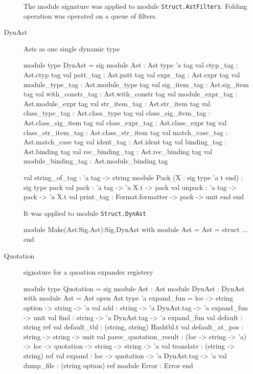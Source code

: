 \begin{description}
The module signature was applied to module
\verb|Struct.AstFilters|. Folding operation was operated on a queue of
filters. 

\item[DynAst] Asts as one single dynamic type

\begin{ocamlcode}
  module type DynAst =
  sig
    module Ast : Ast
    type 'a tag
    val ctyp_tag : Ast.ctyp tag
    val patt_tag : Ast.patt tag
    val expr_tag : Ast.expr tag
    val module_type_tag : Ast.module_type tag
    val sig_item_tag : Ast.sig_item tag
    val with_constr_tag : Ast.with_constr tag
    val module_expr_tag : Ast.module_expr tag
    val str_item_tag : Ast.str_item tag
    val class_type_tag : Ast.class_type tag
    val class_sig_item_tag : Ast.class_sig_item tag
    val class_expr_tag : Ast.class_expr tag
    val class_str_item_tag : Ast.class_str_item tag
    val match_case_tag : Ast.match_case tag
    val ident_tag : Ast.ident tag
    val binding_tag : Ast.binding tag
    val rec_binding_tag : Ast.rec_binding tag
    val module_binding_tag : Ast.module_binding tag
      
    val string_of_tag : 'a tag -> string
    module Pack (X : sig type 'a t  end) :
      sig
        type pack
        val pack : 'a tag -> 'a X.t -> pack
        val unpack : 'a tag -> pack -> 'a X.t
        val print_tag : Format.formatter -> pack -> unit
      end
  end
\end{ocamlcode}

It was applied to module \verb|Struct.DynAst|

\begin{ocamlcode}
  module Make(Ast:Sig.Ast):Sig.DynAst with module Ast = Ast = struct
    ...
  end 
\end{ocamlcode}


\item[Quotation] signature for a quoation expander registery

\begin{ocamlcode}
  module type Quotation =
  sig
    module Ast : Ast
    module DynAst : DynAst with module Ast = Ast
    open Ast
    type 'a expand_fun = loc -> string option -> string -> 'a
    val add : string -> 'a DynAst.tag -> 'a expand_fun -> unit
    val find : string -> 'a DynAst.tag -> 'a expand_fun
    val default : string ref
    val default_tbl : (string, string) Hashtbl.t
    val default_at_pos : string -> string -> unit
    val parse_quotation_result :
      (loc -> string -> 'a) -> loc -> quotation -> string -> string -> 'a
    val translate : (string -> string) ref
    val expand : loc -> quotation -> 'a DynAst.tag -> 'a
    val dump_file : (string option) ref
    module Error : Error
  end
\end{ocamlcode}


\end{description}
